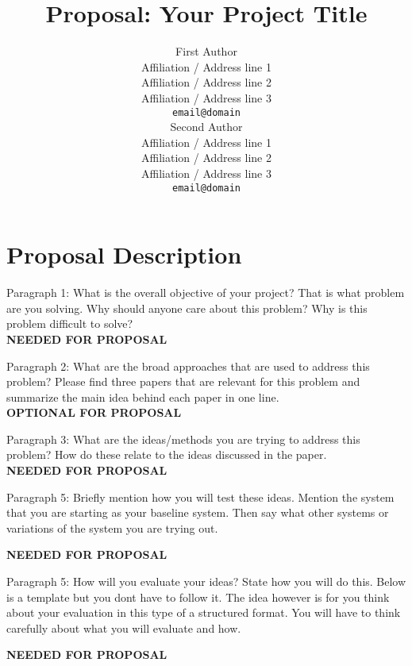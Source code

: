 \documentclass[11pt,a4paper]{article}
\title{Proposal: Your Project Title}
\author{First Author \\
  Affiliation / Address line 1 \\
  Affiliation / Address line 2 \\
  Affiliation / Address line 3 \\
  {\tt email@domain} \\\And
  Second Author \\
  Affiliation / Address line 1 \\
  Affiliation / Address line 2 \\
  Affiliation / Address line 3 \\
  {\tt email@domain} \\}
\date{}
\begin{document}
\maketitle




\section{Proposal Description}

Paragraph 1: What is the overall objective of your project? That is what problem are you solving. Why should anyone care about this problem?
Why is this problem difficult to solve?\\

\textbf{NEEDED FOR PROPOSAL}

Paragraph 2: What are the broad approaches that are used to address this problem? Please find three papers that are relevant for this problem and summarize the main idea behind each paper in one line.\\

\textbf{OPTIONAL FOR PROPOSAL}

Paragraph 3: What are the ideas/methods you are trying to address this problem? How do these relate to the ideas discussed in the paper.  \\

\textbf{NEEDED FOR PROPOSAL}

Paragraph 5: Briefly mention how you will test these ideas. Mention the system that you are starting as your baseline system. 
Then say what other systems or variations of the system you are trying out.

\textbf{NEEDED FOR PROPOSAL}

Paragraph 5: How will you evaluate your ideas? State how you will do this. Below is a template but you dont have to follow it. The idea however is for you think about your evaluation in this type of a structured format. You will have to think carefully about what you will evaluate and how.

\textbf{NEEDED FOR PROPOSAL}
\end{document}
